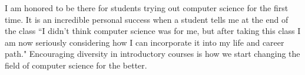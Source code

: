 \documentclass[12pt]{amsart} \usepackage{amssymb}
\begin{document}



\vspace{5cm}
I am honored to be there for students trying out computer science for the first time. It is an incredible personal success when a student tells me at the end of the class ``I didn't think computer science was for me, but after taking this class I am now seriously considering how I can incorporate it into my life and career path." Encouraging diversity in introductory courses is how we start changing the field of computer science for the better.




\end{document}

